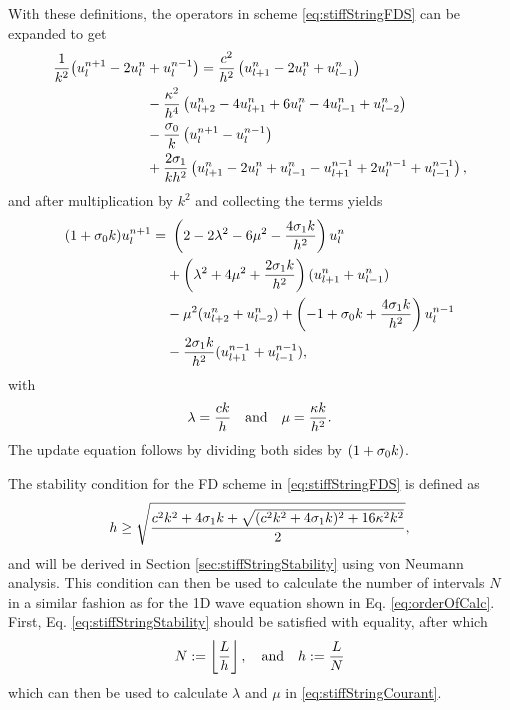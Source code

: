With these definitions, 
the operators in scheme \eqref{eq:stiffStringFDS} can be expanded to get
\begin{equation}
    \begin{aligned}\label{eq:expandedStringFDS}
        \frac{1}{k^2}\big(u_l^{n+1} - 2u_l^n & + u_l^{n-1} \big) =\frac{c^2}{h^2}\left(u_{l+1}^n - 2u_l^n + u_{l-1}^n\right) \\
        &- \frac{\kappa^2}{h^4}\left(u_{l+2}^n - 4u_{l+1}^n+6u_l^n - 4u_{l-1}^n+u_{l-2}^n\right) \\ 
        &- \frac{\sigma_{0}}{k} \left(u_l^{n+1} - u_l^{n-1}\right)\\
        & + \frac{2\sigma_{1}}{kh^2}\left(u_{l+1}^n - 2u_l^n + u_{l-1}^n - u_{l+1}^{n-1} + 2u_l^{n-1} + u_{l-1}^{n-1}\right),
    \end{aligned}
\end{equation}
and after multiplication by $k^2$ and collecting the terms yields
\begin{equation}
    \begin{aligned}
        (1+\sigma_{0} k) u_l^{n+1} =&\ \left(2 - 2\lambda^2 - 6\mu^2 - \frac{4\sigma_{1} k}{h^2}\right) u_l^n\\
        & + \left(\lambda^2 + 4\mu^2 + \frac{2\sigma_{1} k}{h^2}\right) (u_{l+1}^n + u_{l-1}^n) \\
        &- \mu^2 (u_{l+2}^n + u_{l-2}^n) + \left(-1+\sigma_{0} k + \frac{4\sigma_{1} k}{h^2}\right)u_l^{n-1}\\
        & - \frac{2\sigma_{1} k}{h^2}(u_{l+1}^{n-1} + u_{l-1}^{n-1}),
    \end{aligned}
\end{equation}
with 
\begin{equation}\label{eq:stiffStringCourant}
    \lambda = \frac{ck}{h} \quad \text{and} \quad \mu = \frac{\kappa k}{h^2}.
\end{equation}
The update equation follows by dividing both sides by $(1+\sigma_{0} k)$. 

The stability condition for the FD scheme in \eqref{eq:stiffStringFDS} is defined as 
\begin{equation}\label{eq:stiffStringStability}
    h \geq \sqrt{\frac{c^2k^2+4\sigma_{1} k + \sqrt{(c^2k^2 + 4\sigma_{1} k)^2+16\kappa^2k^2}}{2}},
\end{equation}
and will be derived in Section \ref{sec:stiffStringStability} using von Neumann analysis. 
This condition can then be used to calculate the number of intervals $N$ in a similar fashion as for the 1D wave equation shown in Eq. \eqref{eq:orderOfCalc}. First, Eq. \eqref{eq:stiffStringStability} should be satisfied with equality, after which
\begin{equation*}
    N := \floor[\frac{L}{h}], \qaq h := \frac{L}{N}
\end{equation*}
which can then be used to calculate $\lambda$ and $\mu$ in \eqref{eq:stiffStringCourant}.

